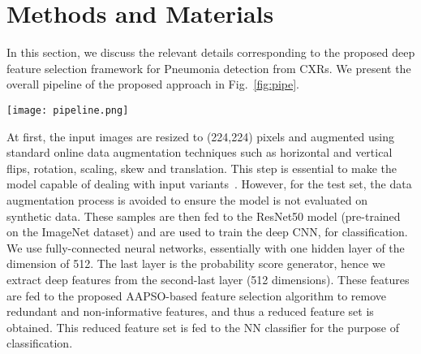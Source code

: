 \documentclass[final,3p,times]{elsarticle}
\begin{document}
\section{Methods and Materials}
\label{sec:proposed}
In this {section, we discuss} the relevant details corresponding to the proposed deep feature selection framework for Pneumonia detection from CXRs. {We present} the overall pipeline of the proposed approach in Fig.~\ref{fig:pipe}.
\begin{figure*}[ht!]
    \centering
    \texttt{[image: pipeline.png]}
    \caption{The overall pipeline of the proposed approach used for Pneumonia detection from CXRs. First, the images are resized and augmented using standard techniques. Then these are fed to the pre-trained ResNet50 model for deep feature extraction. After that the proposed AAPSO selects the most informative features. Finally, the classification is performed using the NN classifier.}
    \label{fig:pipe}
\end{figure*}
At first, the input images are resized to (224,224) pixels and augmented using standard online data augmentation techniques such as horizontal and vertical flips, rotation, scaling, skew and translation. This step is essential to make the model capable of dealing with input variants~\cite{pramanik2022fuzzy}. However, for the test {set, the data augmentation process} is avoided to ensure the model is not evaluated on synthetic data. These samples are then fed to the ResNet50 model (pre-trained on the ImageNet dataset) and are used to train the deep CNN, for classification. We use fully-connected neural networks, essentially with one hidden layer of the dimension of 512. The last layer is the probability score generator, hence we extract deep features from the {second-last} layer (512 dimensions). These features are fed to the proposed {AAPSO-based} feature selection algorithm to remove redundant and non-informative features, and thus a reduced feature set is obtained. This reduced feature set is fed to the NN classifier for the {purpose of classification}.
\end{document}
